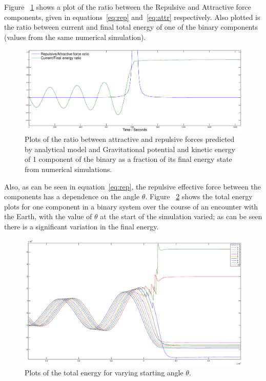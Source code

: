 \documentclass[letterpaper, preprint, paper,11pt]{AAS}	%
\begin{document}
Figure ~\ref{fig:Analy} shows a plot of the ratio between the Repulsive and Attractive force components, given in equations~\ref{eq:rep} and~\ref{eq:attr} respectively. Also plotted is the ratio between current and final total energy of one of the binary components (values from the same numerical simulation). 
\begin{figure}[H]
\centering
\centerline{\includegraphics[width=1.2\textwidth]{binary_analy.eps}} 
\caption{Plots of the ratio between attractive and repulsive forces predicted by analytical model and Gravitational potential and kinetic energy of 1 component of the binary as a fraction of its final energy state from numerical simulations.} 
\label{fig:Analy}
\end{figure} 


Also, as can be seen in equation~\ref{eq:rep}, the repulsive effective force between the components has a dependence on the angle $\theta$. Figure ~\ref{fig:phase} shows the total energy plots for one component in a binary system over the course of an encounter with the Earth, with the value of $\theta$ at the start of the simulation varied; as can be seen there is a significant variation in the final energy. 
 \begin{figure}[H]
\centering
\centerline{\includegraphics[width=1.2\textwidth]{phasing_2.eps}} 
\caption{Plots of the total energy for varying starting angle $\theta$.} 
\label{fig:phase}
\end{figure} 
\end{document}
